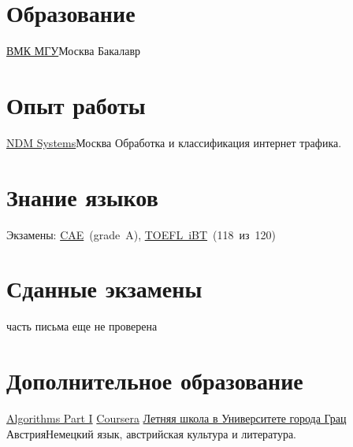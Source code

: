 \documentclass[11pt,a4paper,roman]{moderncv}
\begin{document}
\makecvtitle

\section{Образование}
        {\href{http://cs.msu.ru/}{ВМК МГУ}}{Москва}
        {Бакалавр}
        {}
\section{Опыт работы}
        {\href{http://www.ndmsystems.com}{NDM Systems}}{Москва}
        {}{Обработка и классификация интернет трафика.}

\section{Знание языков}
  {Экзамены:
    \href{https://ru.wikipedia.org/wiki/Certificate_in_Advanced_English}{CAE}~(grade~A),
    \href{https://ru.wikipedia.org/wiki/TOEFL}{TOEFL~iBT}~(118~из~120)
  }

\section{Сданные экзамены}
        {}{}{часть письма еще не проверена}

\section{Дополнительное образование}
        {\href{https://www.coursera.org/course/algs4partI}{Algorithms Part I}}
        {\href{https://www.coursera.org/course/algs4partI}{Coursera}}
        {}{}{}
        {\href{http://treffpunktsprachen.uni-graz.at/en/}{Летняя школа в Университете города Грац}}
        {Австрия}{}{Немецкий язык, австрийская культура и литература.}
\end{document}

